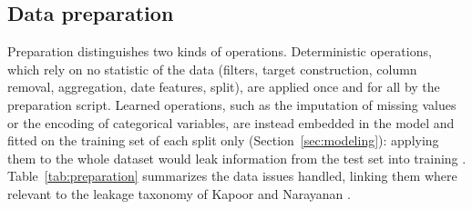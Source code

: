 \documentclass[11pt,a4paper]{article}
\theoremstyle{definition}
\begin{document}
\subsection{Data preparation}
\label{sec:preparation}

Preparation distinguishes two kinds of operations. Deterministic operations, which rely on no statistic of the data (filters, target construction, column removal, aggregation, date features, split), are applied once and for all by the preparation script. Learned operations, such as the imputation of missing values or the encoding of categorical variables, are instead embedded in the model and fitted on the training set of each split only (Section~\ref{sec:modeling}): applying them to the whole dataset would leak information from the test set into training \cite{kapoor2023leakage}. Table~\ref{tab:preparation} summarizes the data issues handled, linking them where relevant to the leakage taxonomy of Kapoor and Narayanan \cite{kapoor2023leakage}.
\end{document}
